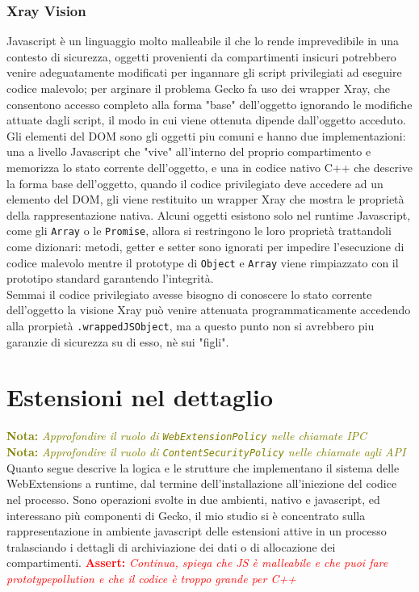 \documentclass[]{sapthesis}
\newcommand{\MComment}[3]{\textcolor{#3}{ \textbf{#1} \textit{#2}}}
\newcommand{\Nota}[1]{\MComment{Nota:}{#1}{olive}}
\newcommand{\Assert}[1]{\MComment{Assert:}{#1}{red}}
\newcommand{\code}[1]{\texttt{#1}}
\newcommand{\WebExtensionPolicy}{\code{WebExtensionPolicy} }
\newcommand{\ContentSecurityPolicy}{\code{ContentSecurityPolicy} }
\begin{document}
        \subsection{Xray Vision}
            Javascript è un linguaggio molto malleabile il che lo rende imprevedibile in una contesto di
            sicurezza, oggetti provenienti da compartimenti insicuri potrebbero venire adeguatamente
            modificati per ingannare gli script privilegiati ad eseguire codice malevolo; per arginare
            il problema Gecko fa uso dei wrapper Xray, che consentono accesso completo alla forma "base"
            dell'oggetto ignorando le modifiche attuate dagli script, il modo in cui viene ottenuta
            dipende dall'oggetto acceduto.\\
            Gli elementi del DOM sono gli oggetti piu comuni e hanno due implementazioni: 
            una a livello Javascript che "vive" all'interno del proprio compartimento e memorizza lo
            stato corrente dell'oggetto, e una in codice nativo C++ che descrive la forma base
            dell'oggetto, quando il codice privilegiato deve accedere ad un elemento del DOM, gli viene
            restituito un wrapper Xray che mostra le proprietà della rappresentazione nativa. 
            Alcuni oggetti esistono solo nel runtime Javascript, come gli \code{Array} o le \code{Promise},
            allora si restringono le loro proprietà trattandoli come dizionari: metodi, getter e setter 
            sono ignorati per impedire l'esecuzione di codice malevolo mentre il prototype di \code{Object}
            e \code{Array} viene rimpiazzato con il prototipo standard garantendo l'integrità.\\
            Semmai il codice privilegiato avesse bisogno di conoscere lo stato corrente dell'oggetto la
            visione Xray può venire attenuata programmaticamente accedendo alla prorpietà \code{.wrappedJSObject},
            ma a questo punto non si avrebbero piu garanzie di sicurezza su di esso, nè sui "figli".
\newpage

\chapter{Estensioni nel dettaglio}
    \Nota{Approfondire il ruolo di \WebExtensionPolicy nelle chiamate IPC}\\
    \Nota{Approfondire il ruolo di \ContentSecurityPolicy nelle chiamate agli API }\\
    Quanto segue descrive la logica e le strutture che implementano il sistema delle WebExtensions a runtime,
    dal termine dell'installazione all'iniezione del codice nel processo. Sono operazioni svolte in due ambienti,
    nativo e javascript, ed interessano più componenti di Gecko, il mio studio si è concentrato sulla
    rappresentazione in ambiente javascript delle estensioni attive in un processo tralasciando i dettagli
    di archiviazione dei dati o di allocazione dei compartimenti.
    \Assert{Continua, spiega che JS è malleabile e che puoi fare prototypepollution e che il codice è troppo grande per C++}
\end{document}
